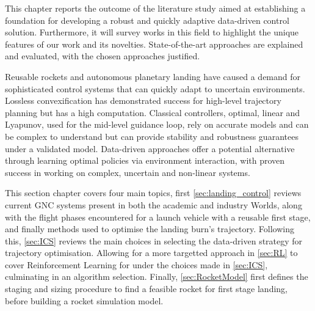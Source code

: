 This chapter reports the outcome of the literature study aimed at establishing a foundation for developing a robust and quickly adaptive data-driven control solution. Furthermore, it will survey works in this field to highlight the unique features of our work and its novelties. State-of-the-art approaches are explained and evaluated, with the chosen approaches justified.

Reusable rockets and autonomous planetary landing have caused a demand for sophisticated control systems that can quickly adapt to uncertain environments. Lossless convexification has demonstrated success for high-level trajectory planning but has a high computation. Classical controllers, optimal, linear and Lyapunov, used for the mid-level guidance loop, rely on accurate models and can be complex to understand but can provide stability and robustness guarantees under a validated model. Data-driven approaches offer a potential alternative through learning optimal policies via environment interaction, with proven success in working on complex, uncertain and non-linear systems.

This section chapter covers four main topics, first \autoref{sec:landing_control} reviews current GNC systems present in both the academic and industry Worlds, along with the flight phases encountered for a launch vehicle with a reusable first stage, and finally methods used to optimise the landing burn's trajectory. Following this, \autoref{sec:ICS} reviews the main choices in selecting the data-driven strategy for trajectory optimisation. Allowing for a more targetted approach in \autoref{sec:RL} to cover Reinforcement Learning for under the choices made in \autoref{sec:ICS}, culminating in an algorithm selection. Finally, \autoref{sec:RocketModel} first defines the staging and sizing procedure to find a feasible rocket for first stage landing, before building a rocket simulation model.